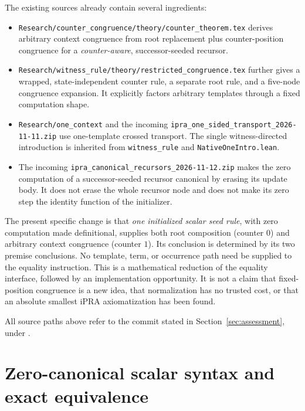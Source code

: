 \documentclass[11pt,a4paper]{article}
\theoremstyle{definition}
\begin{document}
The existing sources already contain several ingredients:
\begin{itemize}
\item \texttt{Research/counter\_congruence/theory/counter\_theorem.tex}
derives arbitrary context congruence from root replacement plus
counter-position congruence for a \emph{counter-aware}, successor-seeded
recursor.
\item \texttt{Research/witness\_rule/theory/restricted\_congruence.tex}
further gives a wrapped, state-independent counter rule, a separate root
rule, and a five-node congruence expansion. It explicitly factors arbitrary
templates through a fixed computation shape.
\item \texttt{Research/one\_context} and the incoming
\texttt{ipra\_one\_sided\_transport\_2026-11-11.zip} use one-template
crossed transport. The single witness-directed introduction is inherited
from \texttt{witness\_rule} and \texttt{NativeOneIntro.lean}.
\item The incoming \texttt{ipra\_canonical\_recursors\_2026-11-12.zip}
makes the zero computation of a successor-seeded recursor canonical by
erasing its update body. It does not erase the whole recursor node and
does not make its zero step the identity function of the initializer.
\end{itemize}

The present specific change is that \emph{one initialized scalar seed
rule}, with zero computation made definitional, supplies both root
composition (counter $0$) and arbitrary context congruence (counter $1$).
Its conclusion is determined by its two premise conclusions. No template,
term, or occurrence path need be supplied to the equality instruction.
This is a mathematical reduction of the equality interface, followed by
an implementation opportunity. It is not a claim that fixed-position
congruence is a new idea, that normalization has no trusted cost, or that
an absolute smallest iPRA axiomatization has been found.

All source paths above refer to the commit stated in
Section~\ref{sec:assessment}, under
.


\section{Zero-canonical scalar syntax and exact equivalence}
\label{zeroI:section}
\end{document}

